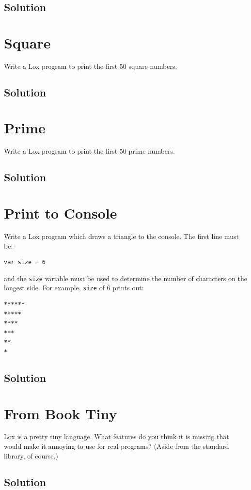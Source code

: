 \documentclass[twoside=false, DIV=14]{scrartcl}
\begin{document}
\subsection*{Solution}
{}

\section*{Square}
Write a Lox program to print the first 50 square numbers.

\subsection*{Solution}
{}

\section*{Prime}
Write a Lox program to print the first 50 prime numbers.

\subsection*{Solution}
{}

\section*{Print to Console}
Write a Lox program which draws a triangle to the console. The first line must be:
\begin{verbatim}
var size = 6
\end{verbatim}
and the \lstinline|size| variable must be used to determine the number of characters on the longest side. For example, \lstinline|size| of 6 prints out:
\begin{verbatim}
******
*****
****
***
**
*
\end{verbatim}

\subsection*{Solution}
{}

\section*{From Book Tiny}
Lox is a pretty tiny language. What features do you think it is missing that would make it annoying to use for real programs? (Aside from the standard library, of course.)

\subsection*{Solution}
{}
\end{document}
